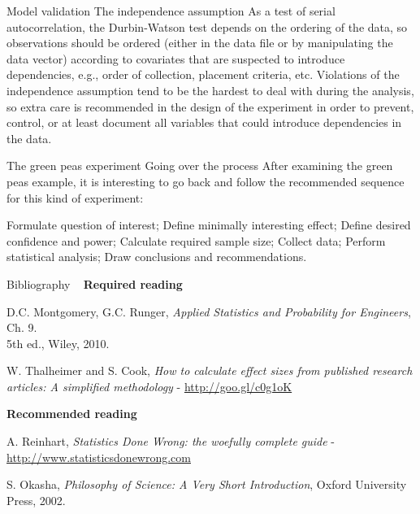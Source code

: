 \documentclass[t]{beamer}
\begin{document}

\begin{ftstf}
{Model validation}
{The independence assumption}
As a test of serial autocorrelation, the Durbin-Watson test depends on the ordering of the data, so observations should be ordered (either in the data file or by manipulating the data vector) according to covariates that are suspected to introduce dependencies, e.g., order of collection, placement criteria, etc.
\vone
Violations of the independence assumption tend to be the hardest to deal with during the analysis, so extra care is recommended in the design of the experiment in order to prevent, control, or at least document all variables that could introduce dependencies in the data.
\end{ftstf}


\begin{ftst}
{The green peas experiment}
{Going over the process}
After examining the green peas example, it is interesting to go back and follow the recommended sequence for this kind of experiment:

\bitems Formulate question of interest;
	\spitem Define minimally interesting effect;
	\spitem Define desired confidence and power;
	\spitem Calculate required sample size;
	\spitem Collect data;
	\spitem Perform statistical analysis;
	\spitem Draw conclusions and recommendations.
\eitem
{}
\end{ftst}



\begin{ftst}
{Bibliography}
{\ }
\scriptsize
\textbf{Required reading}

\benums D.C. Montgomery, G.C. Runger, \textit{Applied Statistics and Probability for Engineers}, Ch. 9.\\5th ed., Wiley, 2010. 
\item W. Thalheimer and S. Cook, \textit{How to calculate effect sizes from published research articles: A simplified methodology} - {\tiny\url{http://goo.gl/c0g1oK}}
\eenum

\textbf{Recommended reading}

\benums A. Reinhart, \textit{Statistics Done Wrong: the woefully complete guide} - {\tiny\url{http://www.statisticsdonewrong.com}}
\item S. Okasha, \textit{Philosophy of Science: A Very Short Introduction}, Oxford University Press, 2002.
\eenum
\end{ftst}
\end{document}
